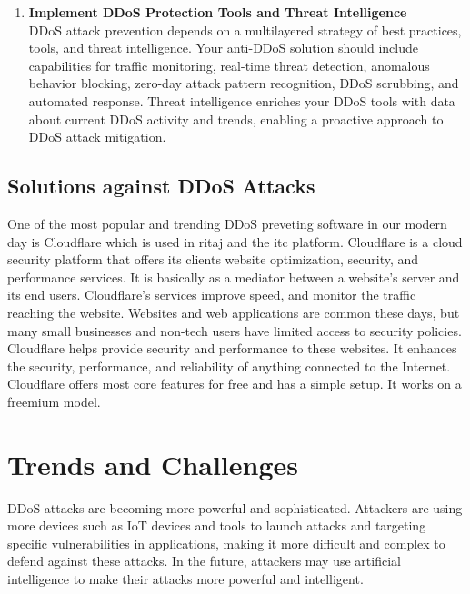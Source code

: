 \documentclass[a4paper, 12pt]{report} %
\begin{document}
\begin{enumerate}
                        \item \textbf{Implement DDoS Protection Tools and Threat Intelligence} \\ DDoS attack prevention depends on a multilayered strategy of best practices, tools, and threat intelligence. Your anti-DDoS solution should include capabilities for traffic monitoring, real-time threat detection, anomalous behavior blocking, zero-day attack pattern recognition, DDoS scrubbing, and automated response. Threat intelligence enriches your DDoS tools with data about current DDoS activity and trends, enabling a proactive approach to DDoS attack mitigation.
                        

                    \end{enumerate}

                    \subsection{Solutions against DDoS Attacks}
                    One of the most popular and trending DDoS preveting software in our modern day is Cloudflare which is used in ritaj and the itc platform. Cloudflare is a cloud security platform that offers its clients website optimization, security, and performance services. It is basically as a mediator between a website’s server and its end users. Cloudflare's services improve speed, and monitor the traffic reaching the website. Websites and web applications are common these days, but many small businesses and non-tech users have limited access to security policies. Cloudflare helps provide security and performance to these websites. It enhances the security, performance, and reliability of anything connected to the Internet. Cloudflare offers most core features for free and has a simple setup. It works on a freemium model.


                    \section{Trends and Challenges}

                    DDoS attacks are becoming more powerful and sophisticated. Attackers are using more devices such as IoT devices and tools to launch attacks and targeting specific vulnerabilities in applications, making it more difficult and complex to defend against these attacks. In the future, attackers may use artificial intelligence to make their attacks more powerful and intelligent.
\end{document}
